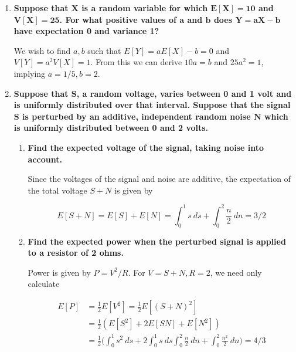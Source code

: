 \documentclass[10pt, oneside]{article}   	%
\theoremstyle{definition}
\begin{document}
\begin{enumerate}[label=7.\arabic*]
\item  \begin{tcolorbox}[
  colback=Cerulean!5!white,
  colframe=Cerulean!75!black]
  \textbf{Suppose that $\bm{X}$ is a random variable for which $\bm{E[X] = 10}$ and $\bm{V[X] = 25}$. For what positive values of $\bm{a}$ and $\bm{b}$ does $\bm{Y = aX - b}$ have expectation 0 and variance 1?}
  \end{tcolorbox}
  
  We wish to find $a, b$ such that $E[Y] = aE[X] - b = 0$ and $V[Y] = a^2 V[X] = 1$. From this we can derive $10a = b$ and $25a^2 = 1$, implying $\boxed{a = 1/5, b = 2}$.
  
\item  \begin{tcolorbox}[
  colback=Cerulean!5!white,
  colframe=Cerulean!75!black]
  \textbf{Suppose that $\bm{S}$, a random voltage, varies between 0 and 1 volt and is uniformly distributed over that interval. Suppose that the signal $\bm{S}$ is perturbed by an additive, independent random noise $\bm{N}$ which is uniformly distributed between 0 and 2 volts.}
  \end{tcolorbox}
  
  	\begin{enumerate}
	\item  \begin{tcolorbox}[
	  colback=Cerulean!5!white,
	  colframe=Cerulean!75!black]
	  \textbf{Find the expected voltage of the signal, taking noise into account.}
	  \end{tcolorbox}
	  
	  Since the voltages of the signal and noise are additive, the expectation of the total voltage $S+N$ is given by
	  
	  \[ E[S+N] = E[S] + E[N] = \int^1_0 s \ ds + \int^2_0 \frac{n}{2} \ dn = \boxed{3/2} \]
	  
	\item  \begin{tcolorbox}[
	  colback=Cerulean!5!white,
	  colframe=Cerulean!75!black]
	  \textbf{Find the expected power when the perturbed signal is applied to a resistor of 2 ohms.}
	  \end{tcolorbox}
	  
	  Power is given by $P = V^2 / R$. For $V = S+N, R = 2$, we need only calculate
	  
	  \begin{align*}
	  E[P] &= \frac{1}{2} E[V^2] = \frac{1}{2} E[(S+N)^2] \\
	  &= \frac{1}{2} ( E[S^2] + 2E[SN] + E[N^2] ) \\
	  &= \frac{1}{2} \Big( \int^1_0 s^2 \ ds + 2 \int^1_0 s \ ds \int^2_0 \frac{n}{2} \ dn + \int^2_0 \frac{n^2}{2} \ dn \Big) = \boxed{4/3}
	  \end{align*}
	\end{enumerate}


\end{enumerate}
\end{document}
